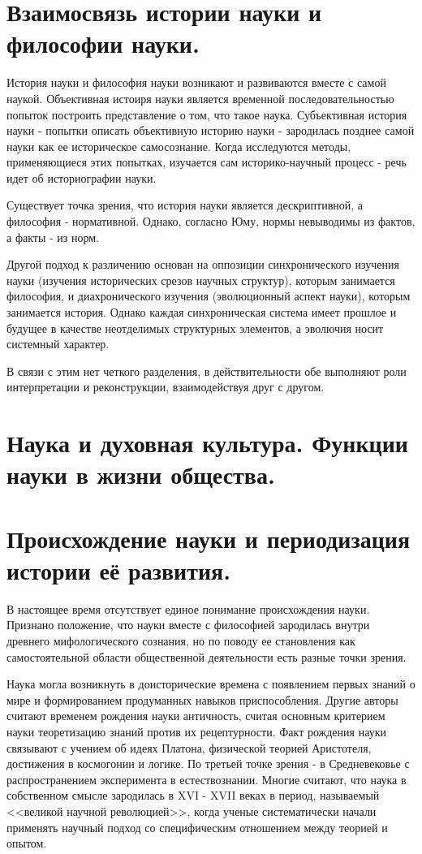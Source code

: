 \documentclass[12pt, specialist, subf, substylefile = spbu.rtx]{disser}
\begin{document}
\section{Взаимосвязь истории науки и философии науки.}
История науки и философия науки возникают и развиваются вместе с самой наукой. Объективная истоиря науки является временной последовательностью попыток построить представление о том, что такое наука. Субъективная история науки - попытки описать объективную историю науки -  зародилась позднее самой науки как ее историческое самосознание. Когда исследуются методы, применяющиеся этих попытках, изучается сам историко-научный процесс - речь идет об историографии науки.

Существует точка зрения, что история науки является дескриптивной, а философия - нормативной. Однако, согласно Юму, нормы невыводимы из фактов, а факты - из норм.

Другой подход к различению основан на оппозиции синхронического изучения науки (изучения исторических срезов научных структур), которым занимается философия, и диахронического изучения (эволюционный аспект науки), которым занимается история. Однако каждая синхроническая система имеет прошлое и будущее в качестве неотделимых структурных элементов, а эволючия носит системный характер.

 В связи с этим нет четкого разделения, в действительности обе выполняют роли интерпретации и реконструкции, взаимодействуя друг с другом.

\section{Наука и духовная культура. Функции науки в жизни общества.}

\section{Происхождение науки и периодизация истории её развития.}
В настоящее время отсутствует единое понимание происхождения науки. Признано положение, что науки вместе с философией зародилась внутри древнего мифологического сознания, но по поводу ее становления как самостоятельной области общественной деятельности есть разные точки зрения.

Наука могла возникнуть в доисторические времена с появлением первых знаний о мире и формированием продуманных навыков приспособления. Другие авторы считают временем рождения науки античность, считая основным критерием науки теоретизацию знаний против их рецептурности. Факт рождения науки связывают с учением об идеях Платона, физической теорией Аристотеля, достижения в космогонии и логике. По третьей точке зрения - в Средневековье с распространением эксперимента в естествознании. Многие считают, что наука в собственном смысле зародилась в XVI - XVII веках в период, называемый <<великой научной революцией>>, когда ученые систематически начали применять научный подход со специфическим отношением между теорией и опытом.
\end{document}
